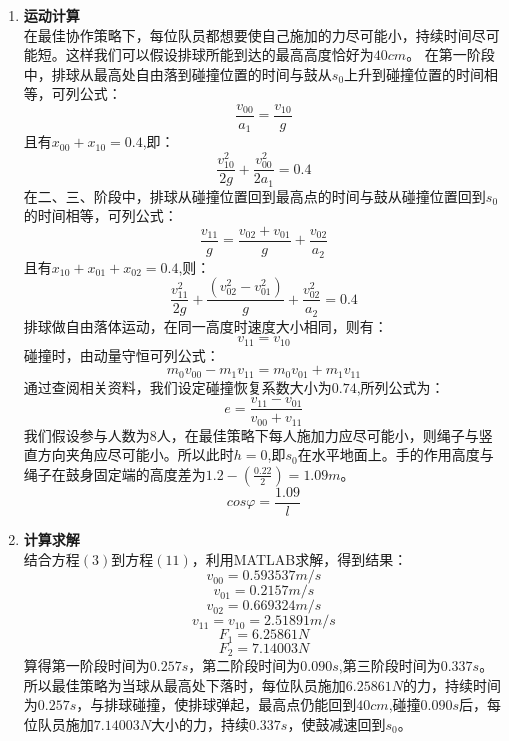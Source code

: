 \documentclass{cumcm}
\begin{document}
\begin{enumerate}
\item \textbf{运动计算}\\
在最佳协作策略下，每位队员都想要使自己施加的力尽可能小，持续时间尽可能短。这样我们可以假设排球所能到达的最高高度恰好为$40cm$。
在第一阶段中，排球从最高处自由落到碰撞位置的时间与鼓从$s_0$上升到碰撞位置的时间相等，可列公式：
\begin{equation}
\frac{v_{00}}{a_1}=\frac{v_{10}}{g}
\end{equation}
且有$x_{00}+x_{10}=0.4$,即：
\begin{equation}
\frac{v^2_{10}}{2g}+\frac{v^2_{00}}{2a_1}=0.4
\end{equation}
在二、三、阶段中，排球从碰撞位置回到最高点的时间与鼓从碰撞位置回到$s_0$的时间相等，可列公式：
\begin{equation}
\frac{v_{11}}{g}=\frac{v_{02}+v_{01}}{g}+\frac{v_{02}}{a_2}
\end{equation}
且有$x_{10}+x_{01}+x_{02}=0.4$,则：
\begin{equation}
\frac{v^2_{11}}{2g}+\frac{(v^2_{02}-v^2_{01})}{g}+\frac{v^2_{02}}{a_2}=0.4
\end{equation}
排球做自由落体运动，在同一高度时速度大小相同，则有：
\begin{equation}
v_{11}=v_{10}
\end{equation}
碰撞时，由动量守恒可列公式：
\begin{equation}
m_0v_{00}-m_1v_{11}=m_0v_{01}+m_1v_{11}
\end{equation}
通过查阅相关资料，我们设定碰撞恢复系数大小为$0.74$,所列公式为：
\begin{equation}
e=\frac{v_{11}-v_{01}}{v_{00}+v_{11}}
\end{equation}
我们假设参与人数为$8$人，在最佳策略下每人施加力应尽可能小，则绳子与竖直方向夹角应尽可能小。所以此时$h=0$,即$s_0$在水平地面上。手的作用高度与绳子在鼓身固定端的高度差为$1.2-(\frac{0.22}{2})=1.09m$。
\begin{equation}
cos\varphi=\frac{1.09}{l}
\end{equation}
\item \textbf{计算求解}\\
结合方程$(3)$到方程$(11)$，利用MATLAB求解，得到结果：
$$v_{00}=0.593537m/s$$
$$v_{01}=0.2157m/s$$
$$v_{02}=0.669324m/s$$
$$v_{11}=v_{10}=2.51891m/s$$
$$F_1=6.25861N$$ 
$$F_2=7.14003N$$
\quad \quad
算得第一阶段时间为$0.257s$，第二阶段时间为$0.090s$,第三阶段时间为$0.337s$。
所以最佳策略为当球从最高处下落时，每位队员施加$6.25861N$的力，持续时间为$0.257s$，与排球碰撞，使排球弹起，最高点仍能回到$40cm$,碰撞$0.090s$后，每位队员施加$7.14003N$大小的力，持续$0.337s$，使鼓减速回到$s_0$。\\

\end{enumerate}
\end{document}
